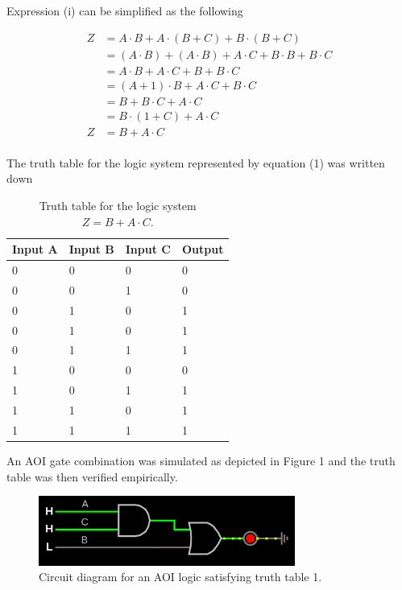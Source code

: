 \documentclass{article}
\begin{document}
	Expression (i) can be simplified as the following
	
	\begin{align*}
	 Z & = A\cdot B + A\cdot(B+C) + B\cdot(B+C)\\
	  & = (A\cdot B) + (A\cdot B) + A\cdot C + B\cdot B + B\cdot C\\
	  & = A\cdot B + A\cdot C + B + B\cdot C\\
	  & = (A+1)\cdot B + A\cdot C + B\cdot C\\
	  & = B + B\cdot C + A\cdot C\\
	  & = B\cdot (1+C) + A\cdot C\\
	  Z & = B + A\cdot C \tag{1}\\
	\end{align*}
	
	The truth table for the logic system represented by equation (1) was written down
	 
		\begin{table}[H]
		\centering
		\begin{tabular}{|l|l|l|l|}
			\hline
			Input A & Input B & Input C & Output\\
			\hline
			0 & 0 & 0 & 0\\
			0 & 0 & 1 & 0\\
			0 &1 &0& 1\\
			0 & 1 & 0 & 1\\
			0 &1 & 1 & 1\\
			1 & 0 & 0 & 0\\
			1 &0 & 1 &1\\
			1 &1 &0 &1\\
			1 &1 &1 &1\\
			\hline
		\end{tabular}
		\caption{Truth table for the logic system $Z = B + A\cdot C$.}
	\end{table}

	An AOI gate combination was simulated as depicted in Figure 1 and the truth table was then verified empirically.
	\begin{figure}[H]
		\centering
		\includegraphics[width=0.75\textwidth]{one}
		\caption{Circuit diagram for an AOI logic satisfying truth table 1.}
		\label{circuit1}
	\end{figure}
\end{document}
